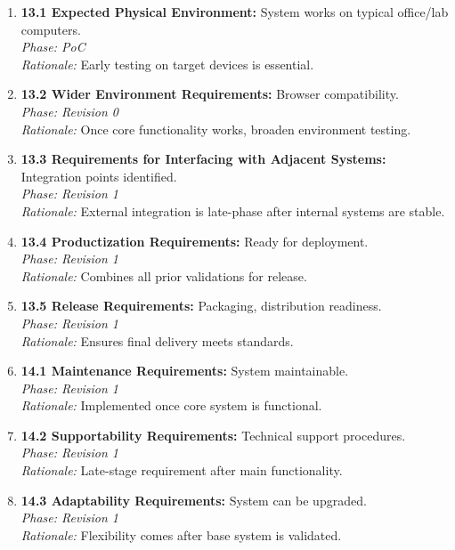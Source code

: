 \documentclass[12pt]{article}
\begin{document}
\begin{enumerate}
    \item \textbf{13.1 Expected Physical Environment:} System works on typical office/lab computers.\\
    \textit{Phase: PoC} \\
    \textit{Rationale:} Early testing on target devices is essential.

    \item \textbf{13.2 Wider Environment Requirements:} Browser compatibility.\\
    \textit{Phase: Revision 0} \\
    \textit{Rationale:} Once core functionality works, broaden environment testing.

    \item \textbf{13.3 Requirements for Interfacing with Adjacent Systems:} Integration points identified.\\
    \textit{Phase: Revision 1} \\
    \textit{Rationale:} External integration is late-phase after internal systems are stable.

    \item \textbf{13.4 Productization Requirements:} Ready for deployment.\\
    \textit{Phase: Revision 1} \\
    \textit{Rationale:} Combines all prior validations for release.

    \item \textbf{13.5 Release Requirements:} Packaging, distribution readiness.\\
    \textit{Phase: Revision 1} \\
    \textit{Rationale:} Ensures final delivery meets standards.

    \item \textbf{14.1 Maintenance Requirements:} System maintainable.\\
    \textit{Phase: Revision 1} \\
    \textit{Rationale:} Implemented once core system is functional.

    \item \textbf{14.2 Supportability Requirements:} Technical support procedures.\\
    \textit{Phase: Revision 1} \\
    \textit{Rationale:} Late-stage requirement after main functionality.

    \item \textbf{14.3 Adaptability Requirements:} System can be upgraded.\\
    \textit{Phase: Revision 1} \\
    \textit{Rationale:} Flexibility comes after base system is validated.


\end{enumerate}
\end{document}
